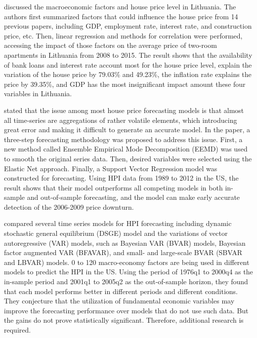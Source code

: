 \documentclass[11pt]{article}
\begin{document}
\citet{GASPARENIENE2016122} discussed the macroeconomic factors and house price level in Lithuania. The authors first summarized factors that could influence the house price from 14 previous papers, including GDP, employment rate, interest rate, and construction price, etc. Then, linear regression and methods for correlation were performed, accessing the impact of those factors on the average price of two-room apartments in Lithuania from 2008 to 2015. The result shows that the availability of bank loans and interest rate account most for the house price level, explain the variation of the house price by 79.03\% and 49.23\%, the inflation rate explains the price by 39.35\%, and GDP has the most insignificant impact amount these four variables in Lithuania.

\citet{10.2139/ssrn.2431627} stated that the issue among most house price forecasting models is that almost all time-series are aggregations of rather volatile elements, which introducing great error and making it difficult to generate an accurate model. In the paper, a three-step forecasting methodology was proposed to address this issue. First, a new method called Ensemble Empirical Mode Decomposition (EEMD) was used to smooth the original series data. Then, desired variables were selected using the Elastic Net approach. Finally, a Support Vector Regression model was constructed for forecasting. Using HPI data from 1989 to 2012 in the US, the result shows that their model outperforms all competing models in both in-sample and out-of-sample forecasting, and the model can make early accurate detection of the 2006-2009 price downturn.

\citet{GUPTA20112013} compared several time series models for HPI forecasting including dynamic stochastic general equilibrium (DSGE) model and the variations of vector autoregressive (VAR) models, such as Bayesian VAR (BVAR) models, Bayesian factor augmented VAR (BFAVAR), and small- and large-scale BVAR (SBVAR and LBVAR) models. 0 to 120 macro-economy factors are being used in different models to predict the HPI in the US. Using the period of 1976q1 to 2000q4 as the in-sample period and 2001q1 to 2005q2 as the out-of-sample horizon, they found that each model performs better in different periods and different conditions. They conjecture that the utilization of fundamental economic variables may improve the forecasting performance over models that do not use such data. But the gains do not prove statistically significant. Therefore, additional research is required.
\end{document}
